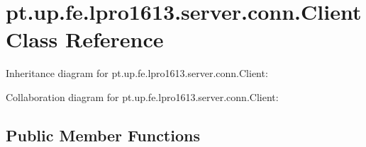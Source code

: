\hypertarget{classpt_1_1up_1_1fe_1_1lpro1613_1_1server_1_1conn_1_1_client}{}\section{pt.\+up.\+fe.\+lpro1613.\+server.\+conn.\+Client Class Reference}
\label{classpt_1_1up_1_1fe_1_1lpro1613_1_1server_1_1conn_1_1_client}


Inheritance diagram for pt.\+up.\+fe.\+lpro1613.\+server.\+conn.\+Client\+:


Collaboration diagram for pt.\+up.\+fe.\+lpro1613.\+server.\+conn.\+Client\+:
\subsection*{Public Member Functions}
